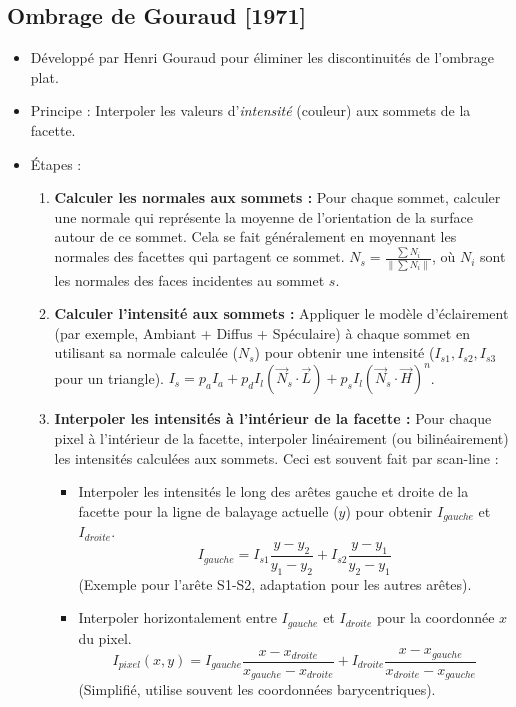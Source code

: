\documentclass{article}
\begin{document}
\subsection{Ombrage de Gouraud [1971]}
\begin{itemize}
    \item Développé par Henri Gouraud pour éliminer les discontinuités de l'ombrage plat.
    \item Principe : Interpoler les valeurs d'\textit{intensité} (couleur) aux sommets de la facette.
    \item Étapes :
        \begin{enumerate}
            \item  \textbf{Calculer les normales aux sommets :} Pour chaque sommet, calculer une normale qui représente la moyenne de l'orientation de la surface autour de ce sommet. Cela se fait généralement en moyennant les normales des facettes qui partagent ce sommet. $N_s = \frac{\sum N_i}{\|\sum N_i\|}$, où $N_i$ sont les normales des faces incidentes au sommet $s$.
            \item  \textbf{Calculer l'intensité aux sommets :} Appliquer le modèle d'éclairement (par exemple, Ambiant + Diffus + Spéculaire) à chaque sommet en utilisant sa normale calculée ($N_s$) pour obtenir une intensité ($I_{s1}, I_{s2}, I_{s3}$ pour un triangle). $I_s = p_a I_a + p_d I_l (\vec{N}_s \cdot \vec{L}) + p_s I_l (\vec{N}_s \cdot \vec{H})^n$.
            \item  \textbf{Interpoler les intensités à l'intérieur de la facette :} Pour chaque pixel à l'intérieur de la facette, interpoler linéairement (ou bilinéairement) les intensités calculées aux sommets. Ceci est souvent fait par scan-line :
                \begin{itemize}
                    \item Interpoler les intensités le long des arêtes gauche et droite de la facette pour la ligne de balayage actuelle ($y$) pour obtenir $I_{gauche}$ et $I_{droite}$.
                      \[ I_{gauche} = I_{s1} \frac{y - y_2}{y_1 - y_2} + I_{s2} \frac{y - y_1}{y_2 - y_1} \]
                      (Exemple pour l'arête S1-S2, adaptation pour les autres arêtes).
                    \item Interpoler horizontalement entre $I_{gauche}$ et $I_{droite}$ pour la coordonnée $x$ du pixel.
                      \[ I_{pixel}(x,y) = I_{gauche} \frac{x - x_{droite}}{x_{gauche} - x_{droite}} + I_{droite} \frac{x - x_{gauche}}{x_{droite} - x_{gauche}} \]
                      (Simplifié, utilise souvent les coordonnées barycentriques).

\end{itemize}
\end{enumerate}
\end{itemize}
\end{document}
